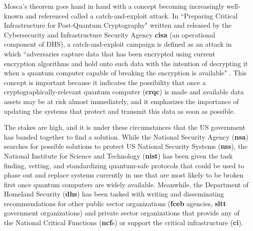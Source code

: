 Mosca's theorem goes hand in hand with a concept becoming increasingly well-known and referenced called a catch-and-exploit attack. In ``Preparing Critical Infrastructure for Post-Quantum Cryptography" written and released by the Cybersecurity and Infrastructure Security Agency \textbf{\gls{cisa}} (an operational component of DHS), a catch-and-exploit campaign is defined as an attack in which ``adversaries capture data that has been encrypted using current encryption algorithms and hold onto such data with the intention of decrypting it when a quantum computer capable of breaking the encryption is available" \cite{cisa_prep4pqc}. This concept is important because it indicates the possibility that once a cryptographically-relevant quantum computer (\textbf{\gls{crqc}}) is made and available data assets may be at risk almost immediately, and it emphasizes the importance of updating the systems that protect and transmit this data as soon as possible. 

The stakes are high, and it is under these circumstances that the US government has banded together to find a solution. While the National Security Agency (\textbf{\gls{nsa}}) searches for possible solutions to protect US National Security Systems (\textbf{\gls{nss}}), the National Institute for Science and Technology (\textbf{\gls{nist}}) has been given the task finding, vetting, and standardizing quantum-safe protocols that could be used to phase out and replace systems currently in use that are most likely to be broken first once quantum computers are widely available. Meanwhile, the Department of Homeland Security (\textbf{\gls{dhs}}) has been tasked with writing and disseminating recommendations for other public sector organizations (\textbf{\gls{fceb}} agencies, \textbf{\gls{sltt}} government organizations) and private sector organizations that provide any of the National Critical Functions (\textbf{\gls{ncf}}s) or support the critical infrastructure (\textbf{\gls{ci}}). 

